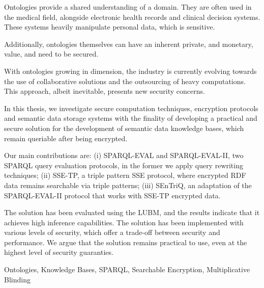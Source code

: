 %

Ontologies provide a shared understanding of a domain. They are often used in the medical field, alongside electronic health records and clinical decision systems. These systems heavily manipulate personal data, which is sensitive.

Additionally, ontologies themselves can have an inherent private, and monetary, value, and need to be secured.

With ontologies growing in dimension, the industry is currently evolving towards the use of collaborative solutions and the outsourcing of heavy computations. This approach, albeit inevitable, presents new security concerns.

In this thesis, we investigate secure computation techniques, encryption protocols and semantic data storage systems with the finality of developing a practical and secure solution for the development of semantic data knowledge bases, which remain queriable after being encrypted.

Our main contributions are: (i) SPARQL-EVAL and SPARQL-EVAL-II, two \gls{SPARQL} query evaluation protocols, in the former we apply query rewriting techniques; (ii) SSE-TP, a triple pattern \gls{SSE} protocol, where encrypted \gls{RDF} data remains searchable via triple patterns; (iii) \gls{SEnTriQ}, an adaptation of the SPARQL-EVAL-II protocol that works with SSE-TP encrypted data.

The solution has been evaluated using the \gls{LUBM}, and the results indicate that it achieves high inference capabilities. The solution has been implemented with various levels of security, which offer a trade-off between security and performance. We argue that the solution remains practical to use, even at the highest level of security guaranties.

\begin{keywords}
Ontologies, Knowledge Bases, SPARQL, Searchable Encryption, Multiplicative Blinding
\end{keywords} 
